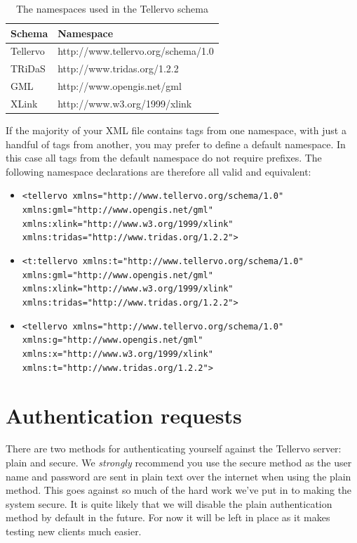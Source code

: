 \begin{table}
\label{tbl:namespaces}
\begin{center}
\begin{tabular}{ll}

\toprule
Schema & Namespace \\
\midrule
Tellervo & http://www.tellervo.org/schema/1.0\\
TRiDaS & http://www.tridas.org/1.2.2\\
GML & http://www.opengis.net/gml\\
XLink & http://www.w3.org/1999/xlink\\
\bottomrule
\end{tabular}
\caption{The namespaces used in the Tellervo schema}
\end{center}
\end{table}


If the majority of your XML file contains tags from one namespace, with just a handful of tags from another, you may prefer to define a default namespace.  In this case all tags from the default namespace do not require prefixes.  The following namespace declarations are therefore all valid and equivalent:

\begin{itemize}
 \item \lstinline$<tellervo xmlns="http://www.tellervo.org/schema/1.0" xmlns:gml="http://www.opengis.net/gml" $ \\ 
  \lstinline$xmlns:xlink="http://www.w3.org/1999/xlink" xmlns:tridas="http://www.tridas.org/1.2.2">$
 \item \lstinline$<t:tellervo xmlns:t="http://www.tellervo.org/schema/1.0" xmlns:gml="http://www.opengis.net/gml" $ \\   \lstinline$xmlns:xlink="http://www.w3.org/1999/xlink" xmlns:tridas="http://www.tridas.org/1.2.2">$
 \item \lstinline$<tellervo xmlns="http://www.tellervo.org/schema/1.0" xmlns:g="http://www.opengis.net/gml" $ \\   \lstinline$xmlns:x="http://www.w3.org/1999/xlink" xmlns:t="http://www.tridas.org/1.2.2">$
\end{itemize}



\section{Authentication requests}

There are two methods for authenticating yourself against the Tellervo server: plain and secure.  We \emph{strongly} recommend you use the secure method as the user name and password are sent in plain text over the internet when using the plain method.  This goes against so much of the hard work we've put in to making the system secure.  It is quite likely that we will disable the plain authentication method by default in the future.  For now it will be left in place as it makes testing new clients much easier.  

